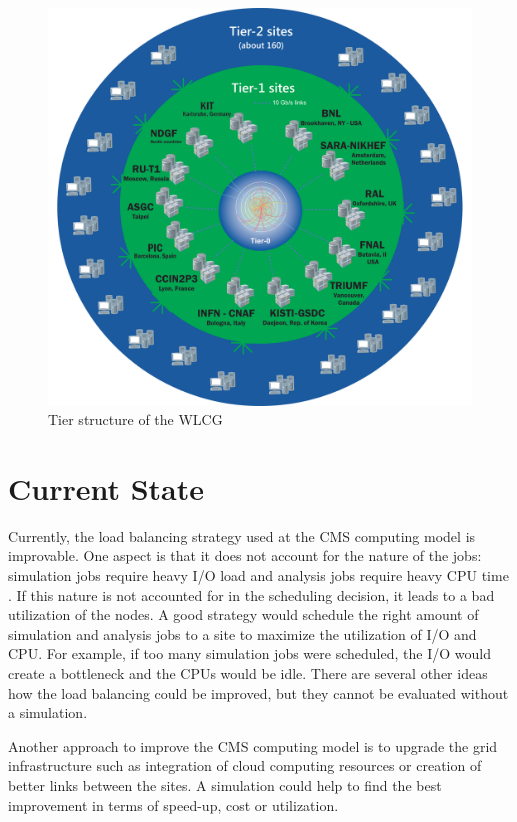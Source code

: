 	\begin{figure}[t!]
		\centering
		\includegraphics[width=0.9\linewidth]{images/WLCG}
		\caption[]{Tier structure of the WLCG \cite{wlcg_tiers}}
		\label{fig:wlcg}
	\end{figure}
	

\section{Current State}
Currently, the load balancing strategy used at the CMS computing model is improvable.
One aspect is that it does not account for the nature of the jobs: simulation jobs require heavy I/O load and analysis jobs require heavy CPU time \cite{1742-6596-331-7-072038}. If this nature is not accounted for in the scheduling decision, it leads to a bad utilization of the nodes. A good strategy would schedule the right amount of simulation and analysis jobs to a site to maximize the utilization of I/O and CPU. For example, if too many simulation jobs were scheduled, the I/O would create a bottleneck and the CPUs would be idle. There are several other ideas how the load balancing could be improved, but they cannot be evaluated without a simulation.

Another approach to improve the CMS computing model is to upgrade the grid infrastructure such as integration of cloud computing resources or creation of better links between the sites. A simulation could help to find the best improvement in terms of speed-up, cost or utilization.


